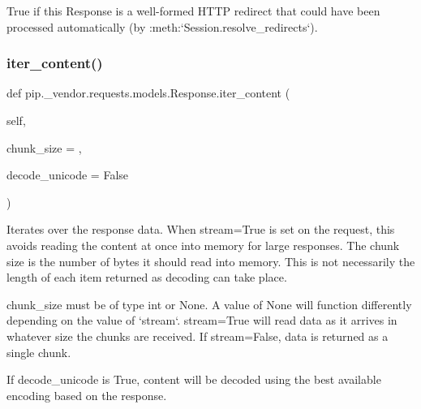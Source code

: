 \begin{DoxyVerb}True if this Response is a well-formed HTTP redirect that could have
been processed automatically (by :meth:`Session.resolve_redirects`).
\end{DoxyVerb}
 \mbox{\label{classpip_1_1__vendor_1_1requests_1_1models_1_1Response_a68fc80b1a8efaf75851183d892434abe}} 
\subsubsection{\texorpdfstring{iter\+\_\+content()}{iter\_content()}}
{\footnotesize\ttfamily def pip.\+\_\+vendor.\+requests.\+models.\+Response.\+iter\+\_\+content (\begin{DoxyParamCaption}\item[{}]{self,  }\item[{}]{chunk\+\_\+size = {},  }\item[{}]{decode\+\_\+unicode = {\ttfamily False} }\end{DoxyParamCaption})}

\begin{DoxyVerb}Iterates over the response data.  When stream=True is set on the
request, this avoids reading the content at once into memory for
large responses.  The chunk size is the number of bytes it should
read into memory.  This is not necessarily the length of each item
returned as decoding can take place.

chunk_size must be of type int or None. A value of None will
function differently depending on the value of `stream`.
stream=True will read data as it arrives in whatever size the
chunks are received. If stream=False, data is returned as
a single chunk.

If decode_unicode is True, content will be decoded using the best
available encoding based on the response.
\end{DoxyVerb}
 \mbox{\label{classpip_1_1__vendor_1_1requests_1_1models_1_1Response_ad14c236faeacc61ae5a6cc0a5d8b67d1}} 
